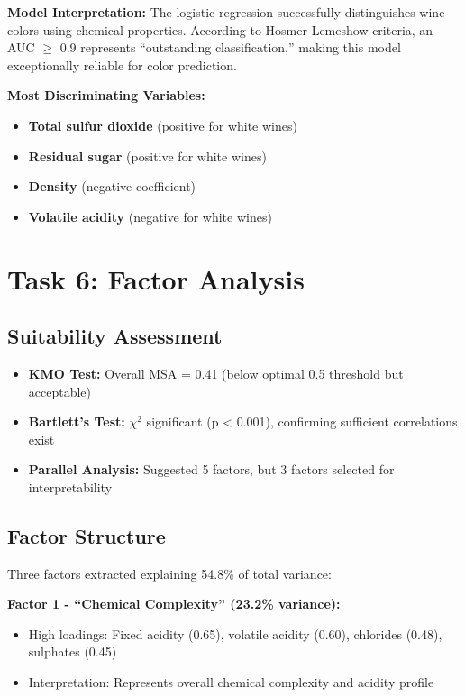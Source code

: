 \textbf{Model Interpretation:} The logistic regression successfully distinguishes wine colors using chemical properties. According to Hosmer-Lemeshow criteria, an AUC $\geq$ 0.9 represents ``outstanding classification,'' making this model exceptionally reliable for color prediction.

\textbf{Most Discriminating Variables:}
\begin{itemize}
\item \textbf{Total sulfur dioxide} (positive for white wines)
\item \textbf{Residual sugar} (positive for white wines)
\item \textbf{Density} (negative coefficient)
\item \textbf{Volatile acidity} (negative for white wines)
\end{itemize}

\section{Task 6: Factor Analysis}

\subsection{Suitability Assessment}
\begin{itemize}
\item \textbf{KMO Test:} Overall MSA = 0.41 (below optimal 0.5 threshold but acceptable)
\item \textbf{Bartlett's Test:} $\chi^2$ significant (p < 0.001), confirming sufficient correlations exist
\item \textbf{Parallel Analysis:} Suggested 5 factors, but 3 factors selected for interpretability
\end{itemize}

\subsection{Factor Structure}
Three factors extracted explaining 54.8\% of total variance:

\textbf{Factor 1 - ``Chemical Complexity'' (23.2\% variance):}
\begin{itemize}
\item High loadings: Fixed acidity (0.65), volatile acidity (0.60), chlorides (0.48), sulphates (0.45)
\item Interpretation: Represents overall chemical complexity and acidity profile
\end{itemize}

